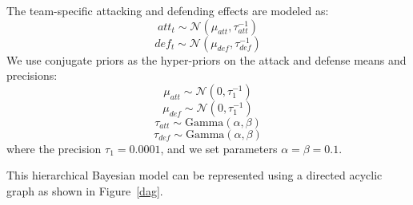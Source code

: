 \documentclass[12pt,letterpaper, onecolumn]{exam}
\begin{document}
\begin{questions}
The team-specific attacking and defending effects are modeled as:
\begin{equation}
att_t \sim \mathcal{N} (\mu_{att}, \tau_{att}^{-1})
\end{equation}
\begin{equation}
def_t \sim \mathcal{N} (\mu_{def}, \tau_{def}^{-1})
\end{equation}
We use conjugate priors as the hyper-priors on the attack and defense means and precisions:
\begin{equation}
\mu_{att} \sim \mathcal{N} (0, \tau_{1}^{-1})
\end{equation}
\begin{equation}
\mu_{def} \sim \mathcal{N} (0, \tau_{1}^{-1})
\end{equation}
\begin{equation}
\tau_{att} \sim \textrm{Gamma} (\alpha,\beta)
\end{equation}
\begin{equation}
\tau_{def} \sim \textrm{Gamma} (\alpha,\beta)
\end{equation}
where the precision $\tau_1 = 0.0001$, and we set parameters $\alpha = \beta = 0.1$.

This hierarchical Bayesian model can be represented using a directed acyclic graph as shown in Figure~\ref{dag}.


\end{questions}
\end{document}
